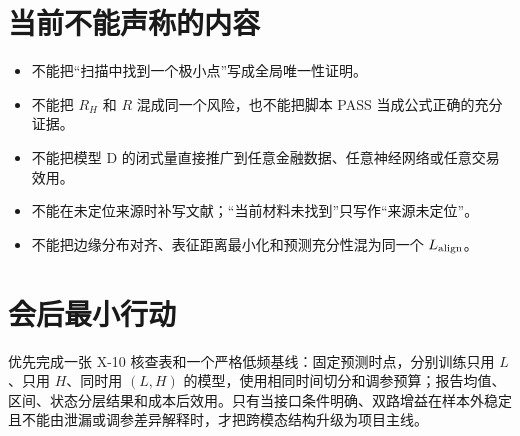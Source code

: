 \documentclass[UTF8,11pt,a4paper]{ctexart}
\begin{document}
\section{当前不能声称的内容}

\begin{itemize}
  \item 不能把“扫描中找到一个极小点”写成全局唯一性证明。
  \item 不能把 $R_H$ 和 $R$ 混成同一个风险，也不能把脚本 PASS 当成公式正确的充分证据。
  \item 不能把模型 D 的闭式量直接推广到任意金融数据、任意神经网络或任意交易效用。
  \item 不能在未定位来源时补写文献；“当前材料未找到”只写作“来源未定位”。
  \item 不能把边缘分布对齐、表征距离最小化和预测充分性混为同一个 $L_{\rm align}$。
\end{itemize}

\section{会后最小行动}

优先完成一张 X-10 核查表和一个严格低频基线：固定预测时点，分别训练只用 $L$、只用 $H$、同时用 $(L,H)$ 的模型，使用相同时间切分和调参预算；报告均值、区间、状态分层结果和成本后效用。只有当接口条件明确、双路增益在样本外稳定且不能由泄漏或调参差异解释时，才把跨模态结构升级为项目主线。
\end{document}
